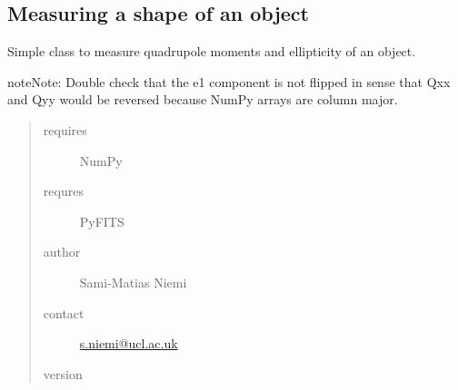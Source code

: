 \documentclass[a4paper,11pt,english]{sphinxmanual}
\begin{document}
\label{analysis:module-analysis.shape}

\subsection{Measuring a shape of an object}
\label{analysis:measuring-a-shape-of-an-object}
Simple class to measure quadrupole moments and ellipticity of an object.

\begin{notice}{note}{Note:}
Double check that the e1 component is not flipped in sense that Qxx and Qyy would be reversed
because NumPy arrays are column major.
\end{notice}
\begin{quote}\begin{description}
\item[{requires}] \leavevmode
NumPy

\item[{requres}] \leavevmode
PyFITS

\item[{author}] \leavevmode
Sami-Matias Niemi

\item[{contact}] \leavevmode
\href{mailto:s.niemi@ucl.ac.uk}{s.niemi@ucl.ac.uk}

\item[{version}] 

\end{description}\end{quote}
\end{document}
